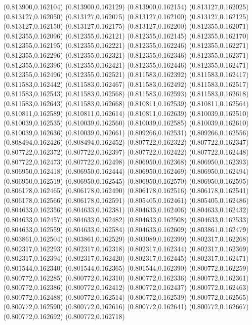 (0.813900,0.162104)
(0.813900,0.162129)
(0.813900,0.162154)
(0.813127,0.162025)
(0.813127,0.162050)
(0.813127,0.162075)
(0.813127,0.162100)
(0.813127,0.162125)
(0.813127,0.162150)
(0.813127,0.162175)
(0.813127,0.162200)
(0.812355,0.162071)
(0.812355,0.162096)
(0.812355,0.162121)
(0.812355,0.162145)
(0.812355,0.162170)
(0.812355,0.162195)
(0.812355,0.162221)
(0.812355,0.162246)
(0.812355,0.162271)
(0.812355,0.162296)
(0.812355,0.162321)
(0.812355,0.162346)
(0.812355,0.162371)
(0.812355,0.162396)
(0.812355,0.162421)
(0.812355,0.162446)
(0.812355,0.162471)
(0.812355,0.162496)
(0.812355,0.162521)
(0.811583,0.162392)
(0.811583,0.162417)
(0.811583,0.162442)
(0.811583,0.162467)
(0.811583,0.162492)
(0.811583,0.162517)
(0.811583,0.162543)
(0.811583,0.162568)
(0.811583,0.162593)
(0.811583,0.162618)
(0.811583,0.162643)
(0.811583,0.162668)
(0.810811,0.162539)
(0.810811,0.162564)
(0.810811,0.162589)
(0.810811,0.162614)
(0.810811,0.162639)
(0.810039,0.162510)
(0.810039,0.162535)
(0.810039,0.162560)
(0.810039,0.162585)
(0.810039,0.162610)
(0.810039,0.162636)
(0.810039,0.162661)
(0.809266,0.162531)
(0.809266,0.162556)
(0.808494,0.162426)
(0.808494,0.162452)
(0.807722,0.162322)
(0.807722,0.162347)
(0.807722,0.162372)
(0.807722,0.162397)
(0.807722,0.162422)
(0.807722,0.162448)
(0.807722,0.162473)
(0.807722,0.162498)
(0.806950,0.162368)
(0.806950,0.162393)
(0.806950,0.162418)
(0.806950,0.162444)
(0.806950,0.162469)
(0.806950,0.162494)
(0.806950,0.162519)
(0.806950,0.162545)
(0.806950,0.162570)
(0.806950,0.162595)
(0.806178,0.162465)
(0.806178,0.162490)
(0.806178,0.162516)
(0.806178,0.162541)
(0.806178,0.162566)
(0.806178,0.162591)
(0.805405,0.162461)
(0.805405,0.162486)
(0.804633,0.162356)
(0.804633,0.162381)
(0.804633,0.162406)
(0.804633,0.162432)
(0.804633,0.162457)
(0.804633,0.162482)
(0.804633,0.162508)
(0.804633,0.162533)
(0.804633,0.162559)
(0.804633,0.162584)
(0.804633,0.162609)
(0.803861,0.162479)
(0.803861,0.162504)
(0.803861,0.162529)
(0.803089,0.162399)
(0.802317,0.162268)
(0.802317,0.162293)
(0.802317,0.162318)
(0.802317,0.162344)
(0.802317,0.162369)
(0.802317,0.162394)
(0.802317,0.162420)
(0.802317,0.162445)
(0.802317,0.162471)
(0.801544,0.162340)
(0.801544,0.162365)
(0.801544,0.162390)
(0.800772,0.162259)
(0.800772,0.162285)
(0.800772,0.162310)
(0.800772,0.162336)
(0.800772,0.162361)
(0.800772,0.162386)
(0.800772,0.162412)
(0.800772,0.162437)
(0.800772,0.162463)
(0.800772,0.162488)
(0.800772,0.162514)
(0.800772,0.162539)
(0.800772,0.162565)
(0.800772,0.162590)
(0.800772,0.162616)
(0.800772,0.162641)
(0.800772,0.162667)
(0.800772,0.162692)
(0.800772,0.162718)
